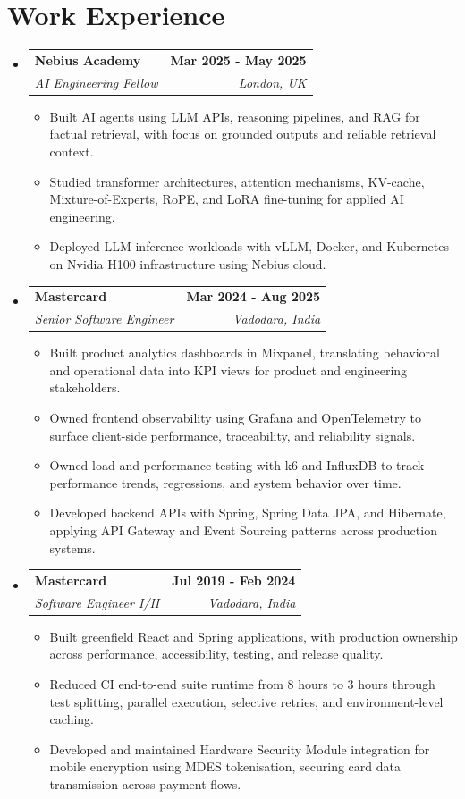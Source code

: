 \documentclass[a4paper,11pt]{article}
\makeatletter
\newcommand{\resumeItem}[1]{
  \item\small{{#1 \vspace{-3pt}}}
}
\newcommand{\resumeSubheading}[4]{
  \vspace{-3pt}\item
    \begin{tabular*}{1.0\textwidth}[t]{l@{\extracolsep{\fill}}r}
      \textbf{#1} & \textbf{\small #2} \\
      \textit{\small#3} & \textit{\small #4} \\
    \end{tabular*}\vspace{-7pt}
}
\newcommand{\resumeSubHeadingListStart}{\begin{itemize}[leftmargin=0.0in, label={}]}
\newcommand{\resumeSubHeadingListEnd}{\end{itemize}}
\newcommand{\resumeItemListStart}{\begin{itemize}}
\newcommand{\resumeItemListEnd}{\end{itemize}\vspace{0pt}}
\makeatother
\begin{document}
\section{Work Experience}
  \resumeSubHeadingListStart
    \resumeSubheading
      {Nebius Academy}{Mar 2025 - May 2025}
      {AI Engineering Fellow}{London, UK}
      \resumeItemListStart
        \resumeItem{Built AI agents using LLM APIs, reasoning pipelines, and RAG for factual retrieval, with focus on grounded outputs and reliable retrieval context.}
        \resumeItem{Studied transformer architectures, attention mechanisms, KV-cache, Mixture-of-Experts, RoPE, and LoRA fine-tuning for applied AI engineering.}
        \resumeItem{Deployed LLM inference workloads with vLLM, Docker, and Kubernetes on Nvidia H100 infrastructure using Nebius cloud.}
      \resumeItemListEnd

    \resumeSubheading
      {Mastercard}{Mar 2024 - Aug 2025}
      {Senior Software Engineer}{Vadodara, India}
      \resumeItemListStart
        \resumeItem{Built product analytics dashboards in Mixpanel, translating behavioral and operational data into KPI views for product and engineering stakeholders.}
        \resumeItem{Owned frontend observability using Grafana and OpenTelemetry to surface client-side performance, traceability, and reliability signals.}
        \resumeItem{Owned load and performance testing with k6 and InfluxDB to track performance trends, regressions, and system behavior over time.}
        \resumeItem{Developed backend APIs with Spring, Spring Data JPA, and Hibernate, applying API Gateway and Event Sourcing patterns across production systems.}
      \resumeItemListEnd

    \resumeSubheading
      {Mastercard}{Jul 2019 - Feb 2024}
      {Software Engineer I/II}{Vadodara, India}
      \resumeItemListStart
        \resumeItem{Built greenfield React and Spring applications, with production ownership across performance, accessibility, testing, and release quality.}
        \resumeItem{Reduced CI end-to-end suite runtime from 8 hours to 3 hours through test splitting, parallel execution, selective retries, and environment-level caching.}
        \resumeItem{Developed and maintained Hardware Security Module integration for mobile encryption using MDES tokenisation, securing card data transmission across payment flows.}
      \resumeItemListEnd
  \resumeSubHeadingListEnd
\end{document}
